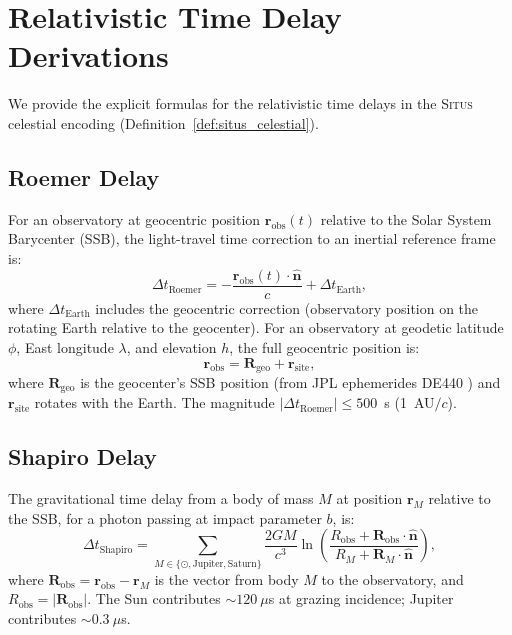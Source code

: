 \documentclass[11pt,a4paper]{article}
\theoremstyle{definition}
\newcommand{\Situs}{\textsc{Situs}}
\begin{document}
\section{Relativistic Time Delay Derivations}
\label{sec:app_relativistic}
We provide the explicit formulas for the relativistic time delays in the \Situs{} celestial encoding (Definition~\ref{def:situs_celestial}).
\subsection{Roemer Delay}
For an observatory at geocentric position $\mathbf{r}_{\mathrm{obs}}(t)$ relative to the Solar System Barycenter (SSB), the light-travel time correction to an inertial reference frame is:
\begin{equation}\label{eq:roemer_full}
\Delta t_{\mathrm{Roemer}} = -\frac{\mathbf{r}_{\mathrm{obs}}(t) \cdot \hat{\mathbf{n}}}{c} + \Delta t_{\mathrm{Earth}},
\end{equation}
where $\Delta t_{\mathrm{Earth}}$ includes the geocentric correction (observatory position on the rotating Earth relative to the geocenter). For an observatory at geodetic latitude $\phi$, East longitude $\lambda$, and elevation $h$, the full geocentric position is:
\begin{equation}
\mathbf{r}_{\mathrm{obs}} = \mathbf{R}_{\mathrm{geo}} + \mathbf{r}_{\mathrm{site}},
\end{equation}
where $\mathbf{R}_{\mathrm{geo}}$ is the geocenter's SSB position (from JPL ephemerides DE440 \cite{DE440}) and $\mathbf{r}_{\mathrm{site}}$ rotates with the Earth. The magnitude $|\Delta t_{\mathrm{Roemer}}| \leq 500$~s (1~AU$/c$).
\subsection{Shapiro Delay}
The gravitational time delay from a body of mass $M$ at position $\mathbf{r}_M$ relative to the SSB, for a photon passing at impact parameter $b$, is:
\begin{equation}\label{eq:shapiro_full}
\Delta t_{\mathrm{Shapiro}} = \sum_{M \in \{\odot, \text{Jupiter}, \text{Saturn}\}} \frac{2 G M}{c^3} \ln\!\left(\frac{R_{\mathrm{obs}} + \mathbf{R}_{\mathrm{obs}} \cdot \hat{\mathbf{n}}}{R_M + \mathbf{R}_M \cdot \hat{\mathbf{n}}}\right),
\end{equation}
where $\mathbf{R}_{\mathrm{obs}} = \mathbf{r}_{\mathrm{obs}} - \mathbf{r}_M$ is the vector from body $M$ to the observatory, and $R_{\mathrm{obs}} = |\mathbf{R}_{\mathrm{obs}}|$. The Sun contributes $\sim 120~\mu$s at grazing incidence; Jupiter contributes $\sim 0.3~\mu$s.
\end{document}
